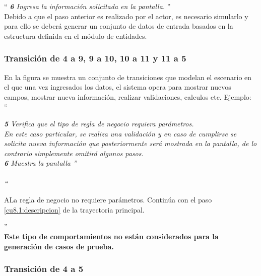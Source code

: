    ``{\it
    {\bf 6} \UCactor Ingresa la información solicitada en la pantalla. 
   }''\\
	
  	Debido a que el paso anterior es realizado por el actor, es necesario simularlo y para ello se deberá generar un conjunto de datos de entrada basados en la estructura definida en el módulo de entidades.

  
 \subsubsection{Transición de 4 a 9, 9 a 10, 10 a 11 y 11 a 5} 
 
 En la figura  se muestra un conjunto de transiciones que modelan el escenario en el que una vez ingresados los datos, el sistema opera para mostrar nuevos campos, mostrar nueva información, realizar validaciones, calculos etc. Ejemplo:\\

  ``{\it
 {\bf 5} \UCsist Verifica que el tipo de regla de negocio requiera parámetros. \\
 
 En este caso particular, se realiza una validación y en caso de cumplirse se solicita nueva información que posteriormente será mostrada en la pantalla, de lo contrario simplemente omitirá algunos pasos.\\
 
 {\bf 6} \UCsist Muestra la pantalla ''\\\\
 ``
 \begin{UCtrayectoriaA}{A}{La regla de negocio no requiere parámetros.}
	\UCpaso[] Continúa con el paso \ref{cu8.1:descripcion} de la trayectoria principal.
 \end{UCtrayectoriaA}
     
  }''\\
	
  	{\bf Este tipo de comportamientos no están considerados para la generación de casos de prueba.}
	
 \subsubsection{Transición de 4 a 5} 
 
